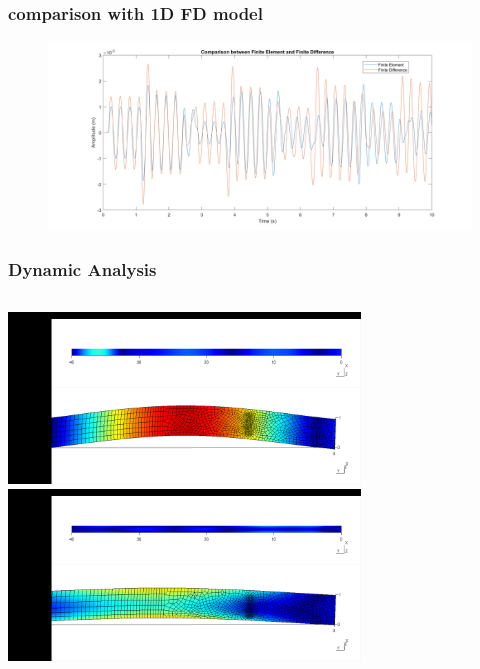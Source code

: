 \documentclass[9pt]{beamer}
\begin{document}
\begin{frame}
\frametitle{comparison with 1D FD model}
\begin{figure}[h!]
\centering
{}%
  \includegraphics[width=\linewidth,trim={2cm 0 2cm 0},clip]{FdvsFe1.png}
\endminipage
\end{figure}
\end{frame}


\begin{frame}
\frametitle{Dynamic Analysis}
\begin{columns}

\href{run:c:/Users/Admin/Desktop/documentation/presentation/movie1.mpg}{\includegraphics[width=0.7\textwidth]{movie1.png}}
\href{run:c:/Users/Admin/Desktop/documentation/presentation/movie2.mpg}{\includegraphics[width=0.7\textwidth]{movie2.png}}
\end{columns}
\end{frame}
\end{document}

